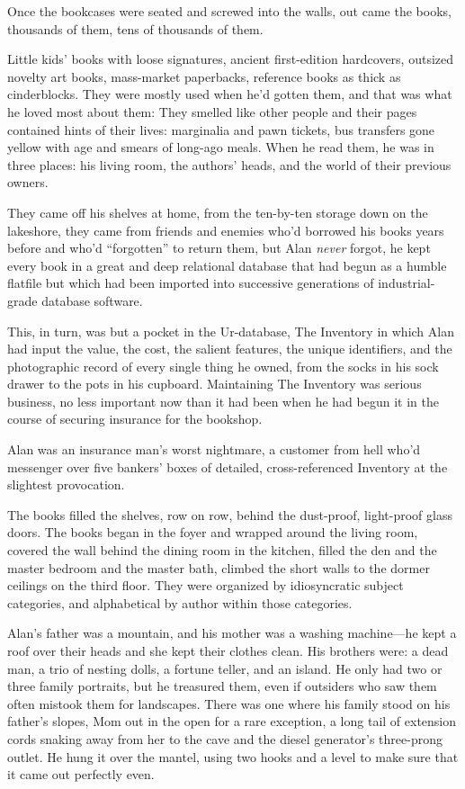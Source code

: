 \documentclass{article}
\begin{document}
Once the bookcases were seated and screwed into the walls, out came
the books, thousands of them, tens of thousands of them.

Little kids' books with loose signatures, ancient first-edition
hardcovers, outsized novelty art books, mass-market paperbacks,
reference books as thick as cinderblocks.  They were mostly used when
he'd gotten them, and that was what he loved most about them:  They
smelled like other people and their pages contained hints of their
lives:  marginalia and pawn tickets, bus transfers gone yellow with
age and smears of long-ago meals.  When he read them, he was in three
places:  his living room, the authors' heads, and the world of their
previous owners.

They came off his shelves at home, from the ten-by-ten storage down on
the lakeshore, they came from friends and enemies who'd borrowed his
books years before and who'd ``forgotten'' to return them, but Alan
\textit{never} forgot, he kept every book in a great and deep
relational database that had begun as a humble flatfile but which had
been imported into successive generations of industrial-grade database
software.

This, in turn, was but a pocket in the Ur-database, The Inventory in
which Alan had input the value, the cost, the salient features, the
unique identifiers, and the photographic record of every single thing
he owned, from the socks in his sock drawer to the pots in his
cupboard.  Maintaining The Inventory was serious business, no less
important now than it had been when he had begun it in the course of
securing insurance for the bookshop.

Alan was an insurance man's worst nightmare, a customer from hell
who'd messenger over five bankers' boxes of detailed, cross-referenced
Inventory at the slightest provocation.

The books filled the shelves, row on row, behind the dust-proof,
light-proof glass doors.  The books began in the foyer and wrapped
around the living room, covered the wall behind the dining room in the
kitchen, filled the den and the master bedroom and the master bath,
climbed the short walls to the dormer ceilings on the third floor. 
They were organized by idiosyncratic subject categories, and
alphabetical by author within those categories.

Alan's father was a mountain, and his mother was a washing
machine---he kept a roof over their heads and she kept their clothes
clean.  His brothers were:  a dead man, a trio of nesting dolls, a
fortune teller, and an island.  He only had two or three family
portraits, but he treasured them, even if outsiders who saw them often
mistook them for landscapes.  There was one where his family stood on
his father's slopes, Mom out in the open for a rare exception, a long
tail of extension cords snaking away from her to the cave and the
diesel generator's three-prong outlet.  He hung it over the mantel,
using two hooks and a level to make sure that it came out perfectly
even.
\end{document}
